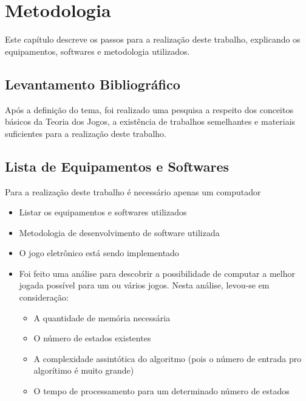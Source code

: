 \chapter[Metodologia]{Metodologia}
\label{cha:metodologia}
	Este capítulo descreve os passos para a realização deste trabalho, explicando os equipamentos, softwares e metodologia utilizados.

\section{Levantamento Bibliográfico}
\label{sec:levantamento-bibliografico}
Após a definição do tema, foi realizado uma pesquisa a respeito dos conceitos básicos da Teoria dos Jogos, a existência de trabalhos semelhantes e materiais suficientes para a realização deste trabalho.


\section{Lista de Equipamentos e Softwares}
\label{sec:lista-de-equipamentos-e-softwares}

Para a realização deste trabalho é necessário apenas um computador

\begin{itemize}
\item
  Listar os equipamentos e softwares utilizados
\item
  Metodologia de desenvolvimento de software utilizada
\item
  O jogo eletrônico está sendo implementado
\item
  Foi feito uma análise para descobrir a possibilidade de computar a
  melhor jogada possível para um ou vários jogos. Nesta análise,
  levou-se em consideração:

  \begin{itemize}
  \tightlist
  \item
    A quantidade de memória necessária
  \item
    O número de estados existentes
  \item
    A complexidade assintótica do algoritmo (pois o número de entrada
    pro algorítimo é muito grande)
  \item
    O tempo de processamento para um determinado número de estados
  \end{itemize}
\end{itemize}
